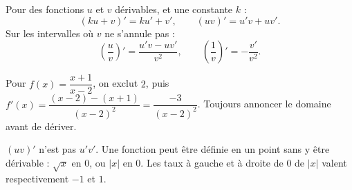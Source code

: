 \begin{propriete}
Pour des fonctions $u$ et $v$ dérivables, et une constante $k$ :
\[(ku+v)'=ku'+v',\qquad(uv)'=u'v+uv'.\]
Sur les intervalles où $v$ ne s'annule pas :
\[\left(\frac uv\right)'=\frac{u'v-uv'}{v^2},\qquad
\left(\frac1v\right)'=-\frac{v'}{v^2}.\]
\end{propriete}
\begin{savoirfaire}
Pour $f(x)=\dfrac{x+1}{x-2}$, on exclut $2$, puis
$f'(x)=\dfrac{(x-2)-(x+1)}{(x-2)^2}=\dfrac{-3}{(x-2)^2}$.
Toujours annoncer le domaine avant de dériver.
\end{savoirfaire}
\begin{attention}
$(uv)'$ n'est pas $u'v'$. Une fonction peut être définie en un point sans y
être dérivable : $\sqrt x$ en 0, ou $|x|$ en 0. Les taux à gauche et à droite
de 0 de $|x|$ valent respectivement $-1$ et $1$.
\end{attention}
\exercices

